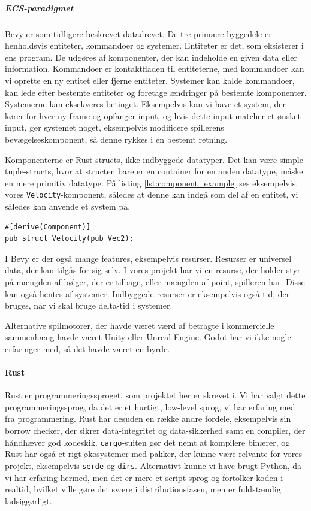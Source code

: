 \subparagraph{ECS-paradigmet} \label{subpar:ecs}
Bevy er som tidligere beskrevet datadrevet. De tre primære byggedele er henholdsvis entiteter, kommandoer og systemer. Entiteter er det, som eksisterer i ens program. De udgøres af komponenter, der kan indeholde en given data eller information. Kommandoer er kontaktfladen til entiteterne, med kommandoer kan vi oprette en ny entitet eller fjerne entiteter. Systemer kan kalde kommandoer, kan lede efter bestemte entiteter og foretage ændringer på bestemte komponenter. Systemerne kan eksekveres betinget. Eksempelvis kan vi have et system, der kører for hver ny frame og opfanger input, og hvis dette input matcher et ønsket input, gør systemet noget, eksempelvis modificere spillerens bevægelseskomponent, så denne rykkes i en bestemt retning.

Komponenterne er Rust-structs, ikke-indbyggede datatyper. Det kan være simple tuple-structs, hvor at structen bare er en container for en anden datatype, måske en mere primitiv datatype. På listing \autoref{lst:component_example} ses eksempelvis, vores \texttt{Velocity}-komponent, således at denne kan indgå som del af en entitet, vi således kan anvende et system på.

\begin{listing}[H]
\begin{verbatim}
#[derive(Component)]
pub struct Velocity(pub Vec2);
\end{verbatim}
\caption{Viser \texttt{Velocity}-komponentet bliver oprettet.}\label{lst:component_example}
\end{listing}

I Bevy er der også mange features, eksempelvis resurser. Resurser er universel data, der kan tilgås for sig selv. I vores projekt har vi en resurse, der holder styr på mængden af bølger, der er tilbage, eller mængden af point, spilleren har. Disse kan også hentes af systemer. Indbyggede resurser er eksempelvis også tid; der  bruges, når vi skal bruge delta-tid i systemer.

Alternative spilmotorer, der havde været værd af betragte i kommercielle sammenhæng havde været Unity eller Unreal Engine. Godot har vi ikke nogle erfaringer med, så det havde været en byrde.

\paragraph{Rust}\label{par:rust}
Rust er programmeringssproget, som projektet her er skrevet i. Vi har valgt dette programmeringssprog, da det er et hurtigt, low-level sprog, vi har erfaring med fra programmering. Rust har desuden en række andre fordele, eksempelvis sin borrow checker, der sikrer data-integritet og data-sikkerhed samt en compiler, der håndhæver god kodeskik. \texttt{cargo}-suiten gør det nemt at kompilere binærer, og Rust har også et rigt økosystemer med pakker, der kunne være relvante for vores projekt, eksempelvis \texttt{serde} og \texttt{dirs}. Alternativt kunne vi have brugt Python, da vi har erfaring hermed, men det er mere et script-sprog og fortolker koden i realtid, hvilket ville gøre det svære i distributionsfasen, men er fuldstændig ladsiggørligt.

